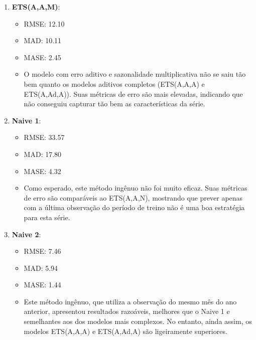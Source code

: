 \documentclass[a4paper, 12pt]{article}
\begin{document}
\begin{enumerate}
    \begin{itemize}
        \item RMSE: 7.95
        \item MAD: 6.52
        \item MASE: 1.58
        \item Este modelo tem erro multiplicativo e sazonalidade multiplicativa, mas suas métricas são superiores (em termos de erro) aos modelos aditivos (ETS(A,A,A) e ETS(A,Ad,A)). Isso sugere que, apesar de ser um modelo mais complexo, ele pode não ser o mais adequado para esta série específica.
    \end{itemize}
    \item \textbf{ETS(A,A,M)}:
    \begin{itemize}
        \item RMSE: 12.10
        \item MAD: 10.11
        \item MASE: 2.45
        \item O modelo com erro aditivo e sazonalidade multiplicativa não se saiu tão bem quanto os modelos aditivos completos (ETS(A,A,A) e ETS(A,Ad,A)). Suas métricas de erro são mais elevadas, indicando que não conseguiu capturar tão bem as características da série.
    \end{itemize}
    \item \textbf{Naive 1}: 
    \begin{itemize}
        \item RMSE: 33.57
        \item MAD: 17.80
        \item MASE: 4.32
        \item Como esperado, este método ingênuo não foi muito eficaz. Suas métricas de erro são comparáveis ao ETS(A,A,N), mostrando que prever apenas com a última observação do período de treino não é uma boa estratégia para esta série.
    \end{itemize}
    \item \textbf{Naive 2}: 
    \begin{itemize}
        \item RMSE: 7.46
        \item MAD: 5.94
        \item MASE: 1.44
        \item Este método ingênuo, que utiliza a observação do mesmo mês do ano anterior, apresentou resultados razoáveis, melhores que o Naive 1 e semelhantes aos dos modelos mais complexos. No entanto, ainda assim, os modelos ETS(A,A,A) e ETS(A,Ad,A) são ligeiramente superiores.
    \end{itemize}
\end{enumerate}
\end{document}
